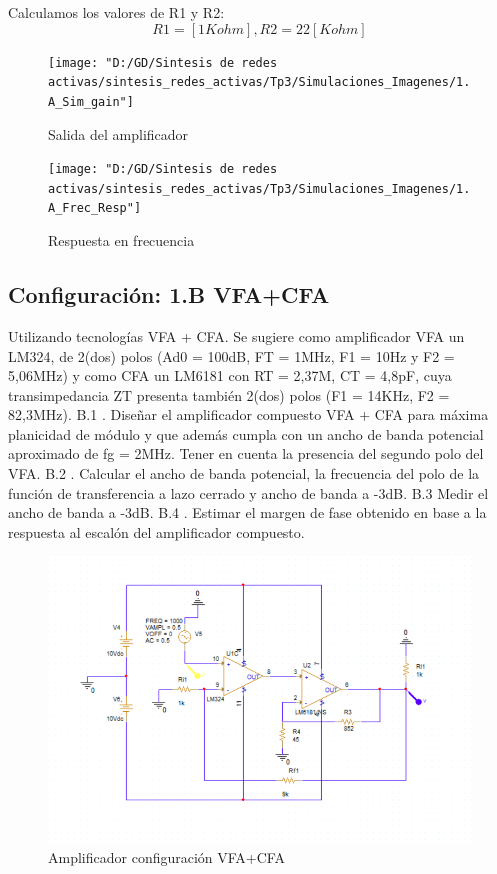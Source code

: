 \documentclass[12pt]{article}
\begin{document}
	Calculamos los valores de R1 y R2:
	\begin{equation}
		R1=[1Kohm], R2=22[Kohm]
	\end{equation}
	
	\begin{figure}[h!]
		\texttt{[image: "D:/GD/Sintesis de redes activas/sintesis\_redes\_activas/Tp3/Simulaciones\_Imagenes/1.A\_Sim\_gain"]}
		\caption[Salida del amplificador]{Salida del amplificador}
		\label{fig:2}
	\end{figure}
	
	\begin{figure}
		\texttt{[image: "D:/GD/Sintesis de redes activas/sintesis\_redes\_activas/Tp3/Simulaciones\_Imagenes/1.A\_Frec\_Resp"]}
		\caption[Respuesta en frecuencia]{Respuesta en frecuencia}
		\label{fig:3}
	\end{figure}
	
	\subsection{Configuración: 1.B VFA+CFA}
	Utilizando tecnologías VFA + CFA. Se sugiere como amplificador VFA un LM324, de 2(dos)
	polos (Ad0 = 100dB, FT = 1MHz, F1 = 10Hz y F2 = 5,06MHz) y como CFA un LM6181 con RT =
	2,37M, CT = 4,8pF, cuya transimpedancia ZT presenta también 2(dos) polos (F1 = 14KHz, F2 =
	82,3MHz).
	B.1 . Diseñar el amplificador compuesto VFA + CFA para máxima planicidad de módulo y que
	además cumpla con un ancho de banda potencial aproximado de fg = 2MHz. Tener en
	cuenta la presencia del segundo polo del VFA.
	B.2 . Calcular el ancho de banda potencial, la frecuencia del polo de la función de transferencia
	a lazo cerrado y ancho de banda a -3dB.
	B.3 Medir el ancho de banda a -3dB.
	B.4 . Estimar el margen de fase obtenido en base a la respuesta al escalón del amplificador
	compuesto.
	
	\begin{figure}[h!]
		\includegraphics[width=1\linewidth]{Simulaciones_Imagenes/1.B_Circ}
		\caption[Amplificador configuración VFA+CFA]{Amplificador configuración VFA+CFA}
		\label{fig:4}
	\end{figure}
	
\end{document}
